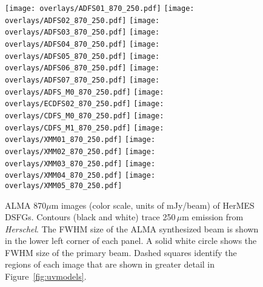 \documentclass[iop]{emulateapj}
\begin{document}
\begin{figure*}[!tbp] 
    \begin{centering}
\texttt{[image: overlays/ADFS01\_870\_250.pdf]}
\texttt{[image: overlays/ADFS02\_870\_250.pdf]}
\texttt{[image: overlays/ADFS03\_870\_250.pdf]}
\texttt{[image: overlays/ADFS04\_870\_250.pdf]}
\texttt{[image: overlays/ADFS05\_870\_250.pdf]}
\texttt{[image: overlays/ADFS06\_870\_250.pdf]}
\texttt{[image: overlays/ADFS07\_870\_250.pdf]}
\texttt{[image: overlays/ADFS\_M0\_870\_250.pdf]}
\texttt{[image: overlays/ECDFS02\_870\_250.pdf]}
\texttt{[image: overlays/CDFS\_M0\_870\_250.pdf]}
\texttt{[image: overlays/CDFS\_M1\_870\_250.pdf]}
\texttt{[image: overlays/XMM01\_870\_250.pdf]}
\texttt{[image: overlays/XMM02\_870\_250.pdf]}
\texttt{[image: overlays/XMM03\_870\_250.pdf]}
\texttt{[image: overlays/XMM04\_870\_250.pdf]}
\texttt{[image: overlays/XMM05\_870\_250.pdf]}
\end{centering}

\caption{ ALMA 870$\mu$m images (color scale, units of mJy/beam) of HerMES
DSFGs.  Contours (black and white) trace 250$\,\mu$m emission from {\it
Herschel}.  The FWHM size of the ALMA synthesized beam is shown in the lower
left corner of each panel.  A solid white circle shows the FWHM size of the
primary beam.  Dashed squares identify the regions of each image that are shown
in greater detail in Figure~\ref{fig:uvmodels}.  \label{fig:imaging}}
\addtocounter{figure}{-1}

\end{figure*}


%
%
\end{document}
